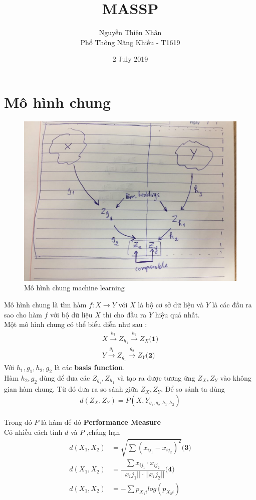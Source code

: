 \documentclass[12pt]{article}
\title{
    MASSP}
\author{
    Nguyễn Thiện Nhân \\
    \large Phổ Thông Năng Khiếu - T1619}
\date{2 July 2019}
\newcommand{\<}{\langle}
\renewcommand{\>}{\rangle}
\theoremstyle{definition}
\begin{document}
\maketitle
\section{Mô hình chung}

\begin{figure}[h]
    \centering
    \includegraphics[width=10cm\textwidth]{Mohinh}
    \caption{Mô hình chung machine learning}
\end{figure}

Mô hình chung là tìm hàm $f: X \rightarrow Y$ với $X$ là bộ cơ sở dữ liệu và $Y$ là các đầu ra sao cho hàm $f$ với bộ dữ liệu $X$ thì cho đầu ra $Y$ hiệu quả nhất.\\
Một mô hình chung có thể biểu diễn như sau :
\begin{align*}
X \overset{h_1}{\rightarrow}  Z_{h_{1}} \overset{h_2}{\rightarrow} Z_X \textbf{(1)} \\  
Y \overset{g_1}{\rightarrow}  Z_{g_{1}} \overset{g_2}{\rightarrow} Z_Y \textbf{(2)}
\end{align*}
Với $h_1,g_1,h_2,g_2$ là các \textbf{basis function}.\\
Hàm $h_2,g_2$ dùng để đưa các $Z_{g_{1}},Z_{h_{1}}$ và tạo ra được tương ứng $Z_X,Z_Y$ vào không gian hàm chung. Từ đó đưa ra so sánh giữa $Z_X,Z_Y$.
Để so sánh ta dùng $$d(Z_X,Z_Y)=P(X,Y _{g_{1},g_{2},h_{1},h_{2}})$$\\
\newpage
Trong đó $P$ là hàm để đó \textbf{Performance Measure}\\
Có nhiều cách tính $d$ và $P$ ,chẳng hạn
\begin{align*}
    d(X_1,X_2)&=\sqrt {\sum (x_{ij_1}-x_{ij_2})^2 } \textbf{(3)}\\
    d(X_1,X_2)&=\dfrac{\sum {x_{ij_{1}} \cdot x_{ij_{2}}}}{||x_ij_{1}|| \cdot ||x_ij_{2}||} \textbf{(4)} \\
    d(X_1,X_2)&=-\sum p_{X_{1}i}log(p_{X_{2}i})
\end{align*}
\end{document}
